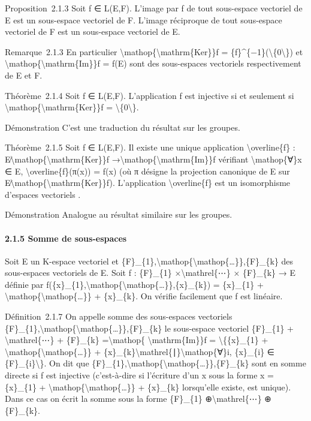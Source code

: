 \documentclass[]{article}
\begin{document}
Proposition~2.1.3 Soit f ∈ L(E,F). L'image par f de tout sous-espace
vectoriel de E est un sous-espace vectoriel de F. L'image réciproque de
tout sous-espace vectoriel de F est un sous-espace vectoriel de E.

Remarque~2.1.3 En particulier
\textbackslash{}mathop\{\textbackslash{}mathrm\{Ker\}\}f =
\{f\}\^{}\{−1\}(\textbackslash{}\{0\textbackslash{}\}) et
\textbackslash{}mathop\{\textbackslash{}mathrm\{Im\}\}f = f(E) sont des
sous-espaces vectoriels respectivement de E et F.

Théorème~2.1.4 Soit f ∈ L(E,F). L'application f est injective si et
seulement si \textbackslash{}mathop\{\textbackslash{}mathrm\{Ker\}\}f =
\textbackslash{}\{0\textbackslash{}\}.

Démonstration C'est une traduction du résultat sur les groupes.

Théorème~2.1.5 Soit f ∈ L(E,F). Il existe une unique application
\textbackslash{}overline\{f\} :
E∕\textbackslash{}mathop\{\textbackslash{}mathrm\{Ker\}\}f
→\textbackslash{}mathop\{\textbackslash{}mathrm\{Im\}\}f vérifiant
\textbackslash{}mathop\{∀\}x ∈ E, \textbackslash{}overline\{f\}(π(x)) =
f(x) (où π désigne la projection canonique de E sur
E∕\textbackslash{}mathop\{\textbackslash{}mathrm\{Ker\}\}f).
L'application \textbackslash{}overline\{f\} est un isomorphisme
d'espaces vectoriels .

Démonstration Analogue au résultat similaire sur les groupes.

\paragraph{2.1.5 Somme de sous-espaces}

Soit E un K-espace vectoriel et
\{F\}\_\{1\},\textbackslash{}mathop\{\textbackslash{}mathop\{\ldots{}\}\},\{F\}\_\{k\}
des sous-espaces vectoriels de E. Soit f : \{F\}\_\{1\}
×\textbackslash{}mathrel\{⋯\} × \{F\}\_\{k\} → E définie par
f(\{x\}\_\{1\},\textbackslash{}mathop\{\textbackslash{}mathop\{\ldots{}\}\},\{x\}\_\{k\})
= \{x\}\_\{1\} +
\textbackslash{}mathop\{\textbackslash{}mathop\{\ldots{}\}\} +
\{x\}\_\{k\}. On vérifie facilement que f est linéaire.

Définition~2.1.7 On appelle somme des sous-espaces vectoriels
\{F\}\_\{1\},\textbackslash{}mathop\{\textbackslash{}mathop\{\ldots{}\}\},\{F\}\_\{k\}
le sous-espace vectoriel \{F\}\_\{1\} + \textbackslash{}mathrel\{⋯\} +
\{F\}\_\{k\} =\textbackslash{}mathop\{ \textbackslash{}mathrm\{Im\}\}f =
\textbackslash{}\{\{x\}\_\{1\} +
\textbackslash{}mathop\{\textbackslash{}mathop\{\ldots{}\}\} +
\{x\}\_\{k\}\textbackslash{}mathrel\{∣\}\textbackslash{}mathop\{∀\}i,
\{x\}\_\{i\} ∈ \{F\}\_\{i\}\textbackslash{}\}. On dit que
\{F\}\_\{1\},\textbackslash{}mathop\{\textbackslash{}mathop\{\ldots{}\}\},\{F\}\_\{k\}
sont en somme directe si f est injective (c'est-à-dire si l'écriture
d'un x sous la forme x = \{x\}\_\{1\} +
\textbackslash{}mathop\{\textbackslash{}mathop\{\ldots{}\}\} +
\{x\}\_\{k\} lorsqu'elle existe, est unique). Dans ce cas on écrit la
somme sous la forme \{F\}\_\{1\} ⊕\textbackslash{}mathrel\{⋯\} ⊕
\{F\}\_\{k\}.
\end{document}
